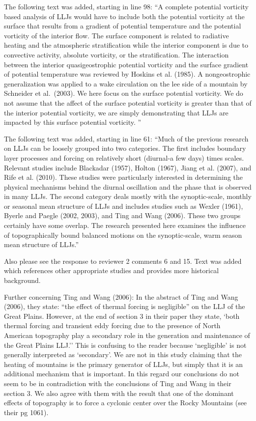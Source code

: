 \documentclass[11pt]{article}
\begin{document}
\medskip
{}  The following text was added, starting in line 98: 
``A complete potential vorticity 
based analysis of LLJs would have to include both the 
potential vorticity at the surface that results from a gradient of potential temperature 
and the potential vorticity of the interior flow.  The surface component is related to 
radiative heating and the atmospheric stratification while the interior component 
is due to convective activity, absolute vorticity, or the stratification.  The interaction 
between the interior quasigeostrophic potential vorticity and the surface gradient of 
potential temperature was reviewed by Hoskins et al. (1985).  A nongeostrophic 
generalization was applied to a wake circulation on the lee side of a mountain by 
Schneider et al.~(2003).  We here focus on the surface potential vorticity.  We do not 
assume that the affect of the surface potential vorticity is greater than that of the 
interior potential vorticity, we are simply demonstrating that LLJs are impacted 
by this surface potential vorticity. ''

The following text was added, starting in line 61:
``Much of the previous research on LLJs can be loosely grouped into two categories.  
The first includes boundary layer processes and forcing on relatively short (diurnal-a few 
days) times scales.  Relevant studies include Blackadar (1957), Holton (1967), Jiang 
et al. (2007), and Rife et al. (2010).  These studies were particularly interested in 
determining the physical mechanisms behind the diurnal oscillation and the phase that 
is observed in many LLJs.  The second category deals mostly with the synoptic-scale, 
monthly or seasonal mean structure of LLJs and includes studies such as Wexler (1961), 
Byerle and Paegle (2002, 2003), and Ting and Wang (2006).  These two groups certainly 
have some overlap.  The research presented here examines the influence of 
topographically bound balanced motions on the synoptic-scale, warm season mean structure of LLJs.''

Also please see the response to reviewer 2 comments 6 and 15.  Text was added which references 
other appropriate studies and provides more historical background.  

Further concerning Ting and Wang (2006):
In the abstract of Ting and Wang (2006), they state: ``the effect of thermal forcing is negligible'' 
on the LLJ of the Great Plains.  However, at the end of section 3 in their paper they state, `both thermal 
forcing and transient eddy forcing due to the presence of North American topography play a secondary 
role in the generation and maintenance of the Great Plains LLJ.''  This is confusing to the reader because 
`negligible' is not generally interpreted as `secondary'.  We are not in this study claiming that the heating 
of mountains is the primary generator of LLJs, but simply that it is an additional mechanism that is 
important.  In this regard our conclusions do not seem to be in contradiction with the conclusions of 
Ting and Wang in their section 3.  We also agree with them with the result that one of the dominant 
effects of topography is to force a cyclonic center over the Rocky Mountains (see their pg 1061).  
\end{document}
